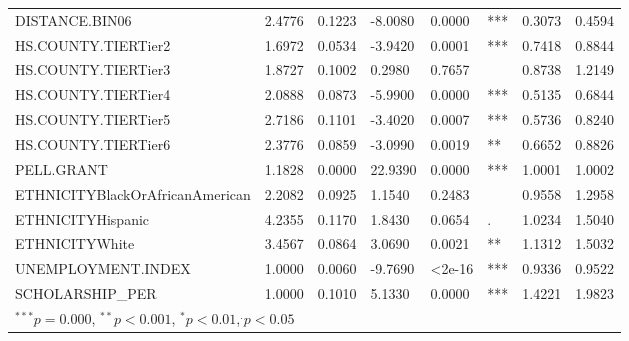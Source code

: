 \documentclass[12pt,english]{report}
\begin{document}
\begin{table}[H]
\begin{adjustbox}{width=0.95\textwidth}
\begin{tabular}{|llllllll|}
DISTANCE.BIN06                  & 2.4776   & 0.1223     & -8.0080 & 0.0000     & ***         & 0.3073 & 0.4594 \\
HS.COUNTY.TIERTier2             & 1.6972   & 0.0534     & -3.9420 & 0.0001     & ***         & 0.7418 & 0.8844 \\
HS.COUNTY.TIERTier3             & 1.8727   & 0.1002     & 0.2980  & 0.7657     &             & 0.8738 & 1.2149 \\
HS.COUNTY.TIERTier4             & 2.0888   & 0.0873     & -5.9900 & 0.0000     & ***         & 0.5135 & 0.6844 \\
HS.COUNTY.TIERTier5             & 2.7186   & 0.1101     & -3.4020 & 0.0007     & ***         & 0.5736 & 0.8240 \\
HS.COUNTY.TIERTier6             & 2.3776   & 0.0859     & -3.0990 & 0.0019     & **          & 0.6652 & 0.8826 \\
PELL.GRANT     & 1.1828   & 0.0000     & 22.9390 & 0.0000     & ***& 1.0001 & 1.0002 \\
ETHNICITYBlackOrAfricanAmerican & 2.2082   & 0.0925     & 1.1540  & 0.2483     &             & 0.9558 & 1.2958 \\
ETHNICITYHispanic               & 4.2355   & 0.1170     & 1.8430  & 0.0654     & .           & 1.0234 & 1.5040 \\
ETHNICITYWhite                  & 3.4567   & 0.0864     & 3.0690  & 0.0021     & **          & 1.1312 & 1.5032 \\
UNEMPLOYMENT.INDEX              & 1.0000   & 0.0060     & -9.7690 & \textless2e-16     & ***         & 0.9336 & 0.9522 \\
SCHOLARSHIP\_PER                & 1.0000   & 0.1010     & 5.1330  & 0.0000     & ***         & 1.4221 & 1.9823    \\
\hline \hline
\multicolumn{7}{l}{\scriptsize{$^{***} p=0.000$, $^{**} p<0.001$, $^*p<0.01$,$^{.}p<0.05$}}

\end{tabular}
\end{adjustbox}
\end{table}
\end{document}
